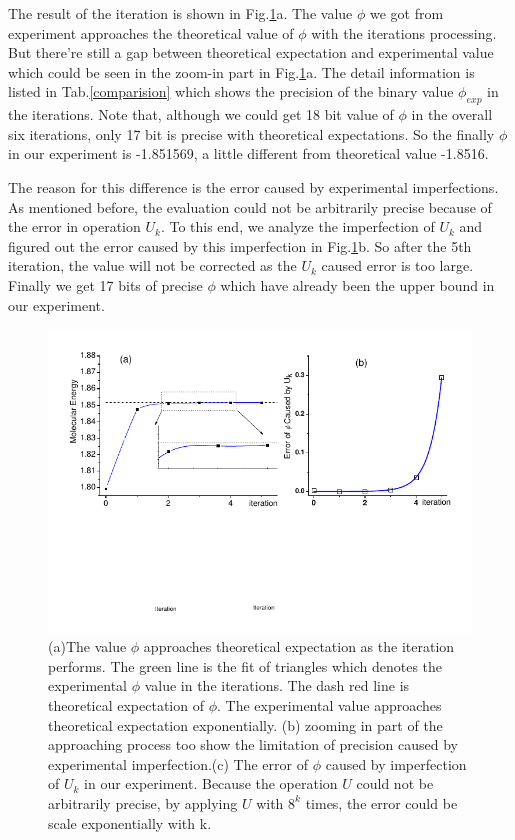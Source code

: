 \documentclass[twocolumn,showpacs,twoside,10pt,superscriptaddress,prl]{revtex4}
\begin{document}
The result of the iteration is shown in Fig.\ref{expresult}a. The
value $\phi$ we got from experiment approaches the theoretical value
of $\phi$ with the iterations processing. But there're still a gap
between theoretical expectation and experimental value which could
be seen in the zoom-in part in Fig.\ref{expresult}a. The detail
information is listed in Tab.\ref{comparision} which shows the
precision of the binary value $\phi_{exp}$ in the iterations. Note
that, although we could get 18 bit value of $\phi$ in the overall
six iterations, only 17 bit is precise with theoretical
expectations. So the finally $\phi$ in our experiment is -1.851569,
a little different from theoretical value -1.8516.

The reason for this difference is the error caused by experimental
imperfections. As mentioned before, the evaluation could not be
arbitrarily precise because of the error in operation $U_k$. To this
end, we analyze the imperfection of $U_k$ and figured out the error
caused by this imperfection in Fig.\ref{expresult}b. So after the
5th iteration, the value will not be corrected as the $U_k$ caused
error is too large. Finally we get 17 bits of precise $\phi$ which
have already been the upper bound in our experiment.

\begin{figure}[htb]
\begin{center}
\includegraphics[width= 0.99\columnwidth]{expresult}
\end{center}
\caption{(a)The value $\phi$ approaches theoretical expectation as
the iteration performs. The green line is the fit of triangles which
denotes the experimental $\phi$ value in the iterations. The dash
red line is theoretical expectation of $\phi$. The experimental
value approaches theoretical expectation exponentially. (b) zooming
in part of the approaching process too show the limitation of
precision caused by experimental imperfection.(c) The error of
$\phi$ caused by imperfection of $U_k$ in our experiment. Because
the operation $U$ could not be arbitrarily precise, by applying $U$
with $8^k$ times, the error could be scale exponentially with
k.}\label{expresult}
\end{figure}
\end{document}
